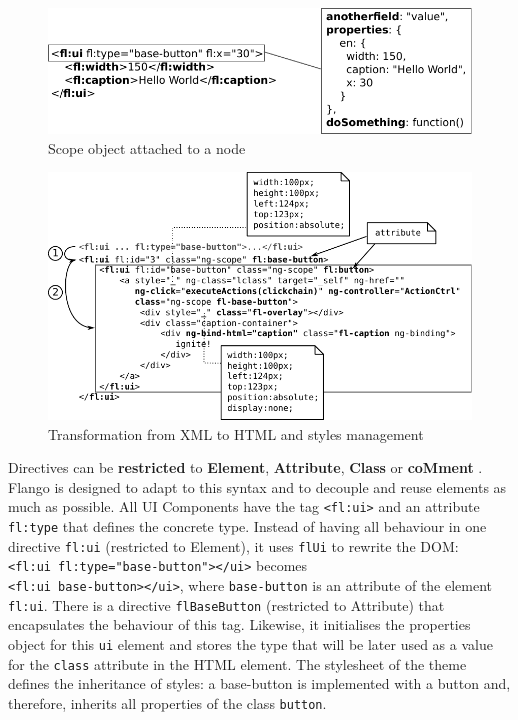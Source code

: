 \begin{figure}[h]
    \centering
    \includegraphics{figures/design/properties-management.pdf}
    \caption{Scope object attached to a node}
    \label{fig:design-properties-management}
\end{figure}




\begin{figure}
    \centering
    \includegraphics{figures/design/from-xml-to-html-3.pdf}
    \caption{Transformation from \acs{XML} to \acs{HTML} and styles management}
    \label{fig:design-xml-to-html-3}
\end{figure}

Directives can be \textbf{restricted} to \textbf{Element}, \textbf{Attribute}, \textbf{Class} or \textbf{coMment} .
Flango \cm is designed to adapt to this syntax and to decouple and reuse elements as much as possible.
All UI Components have the tag \lstinline$<fl:ui>$ and an attribute \lstinline$fl:type$ that defines the concrete type.
Instead of having all behaviour in one directive \texttt{fl:ui} (restricted to Element), it uses \texttt{flUi} to rewrite the \ac{DOM}:\\
\lstinline$<fl:ui fl:type="base-button"></ui>$ becomes \\ \lstinline$<fl:ui base-button></ui>$, where \texttt{base-button} is an attribute of the element \texttt{fl:ui}.
There is a directive \texttt{flBaseButton} (restricted to Attribute) that encapsulates the behaviour of this tag.
Likewise, it initialises the properties object for this \texttt{ui} element and stores the type that will be later used as a value for the \texttt{class} attribute in the \ac{HTML} element.
The stylesheet of the theme defines the inheritance of styles: a base-button is implemented with a button and, therefore, inherits all properties of the class \texttt{button}.

